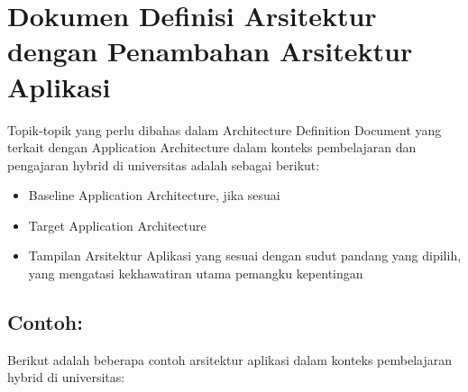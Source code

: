\section{Dokumen Definisi Arsitektur dengan Penambahan Arsitektur Aplikasi}
\label{sec:dokumen_definisi_arsitektur_aplikasi}

Topik-topik yang perlu dibahas dalam Architecture Definition Document yang terkait dengan Application Architecture dalam konteks pembelajaran dan pengajaran hybrid di universitas adalah sebagai berikut:

\begin{itemize}
	\item Baseline Application Architecture, jika sesuai
	\item Target Application Architecture
	\item Tampilan Arsitektur Aplikasi yang sesuai dengan sudut pandang yang dipilih, yang mengatasi kekhawatiran utama pemangku kepentingan
\end{itemize}

\subsection*{Contoh:}

Berikut adalah beberapa contoh arsitektur aplikasi dalam konteks pembelajaran hybrid di universitas:


